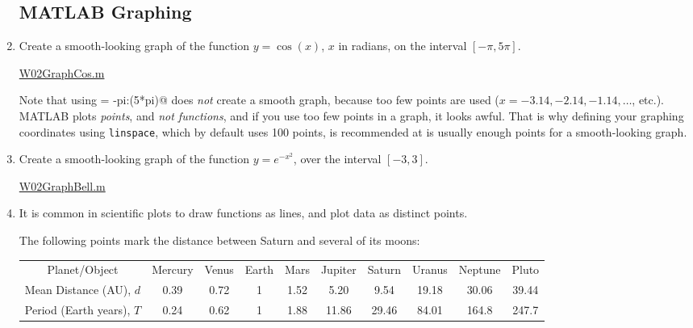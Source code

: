 \begin{enumerate}[1.]
\begin{multicols}{2}
\end{multicols}
\hrulefill

\hrulefill
\subsection*{MATLAB Graphing}
\item 
  \begin{Question}
Create a smooth-looking graph of the function $y = \cos(x)$, $x$
  in radians, on the interval $[-\pi, 5\pi]$.
  \end{Question}
  \begin{Solution}
    
\href{http://www.mast.queensu.ca/~apsc171/MNTCP01/PracticeProblems/MATLAB/W02GraphCos.m}{W02GraphCos.m}



Note that using \verb@x = -pi:(5*pi)@ does {\em not} create a smooth
graph, because too few points are used
($x = -3.14, -2.14, -1.14, \ldots$, etc.).  MATLAB plots {\em points},
and {\em not functions}, and if you use too few points in a graph, it
looks awful. That is why defining your graphing \verb@x@ coordinates
using \texttt{linspace}, which by default uses 100 points, is
recommended at is usually enough points for a smooth-looking graph.
  \end{Solution}

\item 
  \begin{Question}
Create a smooth-looking graph of the function $y = e^{-x^2}$,
  over the interval $[-3, 3]$.
  \end{Question}
\begin{Solution}
\href{http://www.mast.queensu.ca/~apsc171/MNTCP01/PracticeProblems/MATLAB/W02GraphBell.m}{W02GraphBell.m}


\end{Solution}

\item 
  \begin{Question}
    It is common in scientific plots to draw functions as lines, and
    plot data as distinct points.

    The following points mark the distance between Saturn and several
    of its moons:

\begin{tabular}{cccccccccc}
Planet/Object & Mercury& 	Venus& 	Earth& 	Mars& 	Jupiter& 	Saturn& 	Uranus& 	Neptune& 	Pluto \\
Mean Distance (AU), $d$& 0.39& 	0.72& 	1& 	1.52& 	5.20& 	9.54& 	19.18& 	30.06& 	39.44 \\
Period (Earth years), $T$  & 0.24&	0.62&	1&	1.88&	11.86&	29.46&	84.01&	164.8&	247.7 \\
\end{tabular}


\end{Question}
\end{enumerate}
